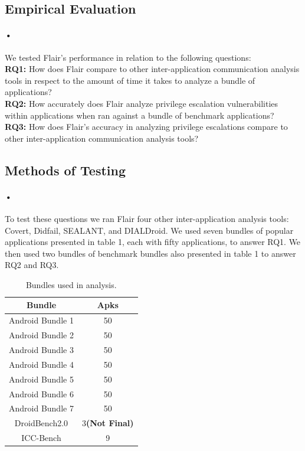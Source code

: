 \documentclass[twocolumn]{article}
\begin{document}
\begin{center}
\section[2]{Empirical Evaluation}
\end{center}

\paragraph{•}
	We tested Flair's performance in relation to the following questions:\\
	\textbf{RQ1:} How does Flair compare to other inter-application communication analysis tools in respect to the amount of time it takes to analyze a bundle of applications?\\
	\textbf{RQ2:} How accurately does Flair analyze privilege escalation vulnerabilities within applications when ran against a bundle of benchmark applications?\\
	\textbf{RQ3:} How does Flair's accuracy in analyzing privilege escalations compare to other inter-application communication analysis tools?\\

\subsection{Methods of Testing} \label{methods}
\paragraph{•}
	To test these questions we ran Flair four other inter-application analysis tools: Covert, Didfail, SEALANT, and DIALDroid. We used seven bundles of popular applications presented in table 1, each with fifty applications, to answer RQ1. We then used two bundles of benchmark bundles also presented in table 1 to answer RQ2 and RQ3. 

\begin{table}[h]
\begin{center}
\begin{tabular}{ |c c| }
	\hline
	Bundle & Apks\\
	\hline
	Android Bundle 1 & 50\\
	Android Bundle 2 & 50\\
	Android Bundle 3 & 50\\
	Android Bundle 4 & 50\\
	Android Bundle 5 & 50\\
	Android Bundle 6 & 50\\
	Android Bundle 7 & 50\\
	DroidBench2.0 & 3\textbf{(Not Final)}\\
	ICC-Bench & 9\\
	\hline
\end{tabular}
\end{center}
\caption{Bundles used in analysis.}
\label{table:1}
\end{table}
\end{document}
